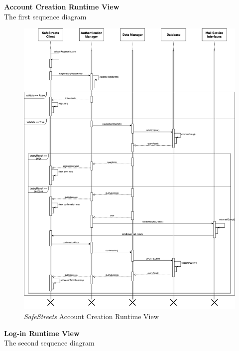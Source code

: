 \documentclass{article}
\begin{document}
	{\bf Account Creation Runtime View} \\
	The first sequence diagram \\
	\begin{figure}[H]
			\centering
			\includegraphics[scale=0.25]{Images/Diagrams/Runtime/registration_runtime.png}
			\caption{{\it SafeStreets} Account Creation Runtime View}
	\end{figure}	
	\pagebreak
	\noindent
	{\bf Log-in Runtime View} \\
	The second sequence diagram \\
\end{document}
